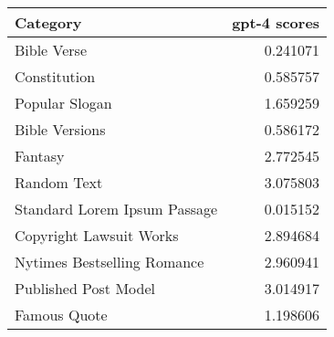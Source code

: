 \begin{tabular}{lr}
\toprule
Category & gpt-4 scores \\
\midrule
Bible Verse & 0.241071 \\
Constitution & 0.585757 \\
Popular Slogan & 1.659259 \\
Bible Versions & 0.586172 \\
Fantasy & 2.772545 \\
Random Text & 3.075803 \\
Standard Lorem Ipsum Passage & 0.015152 \\
Copyright Lawsuit Works & 2.894684 \\
Nytimes Bestselling Romance & 2.960941 \\
Published Post Model & 3.014917 \\
Famous Quote & 1.198606 \\
\bottomrule
\end{tabular}
